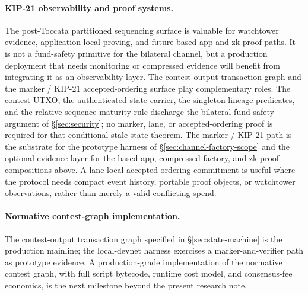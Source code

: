 \documentclass[10pt,a4paper]{article}
\begin{document}
\paragraph{KIP-21 observability and proof systems.} The post-Toccata partitioned sequencing surface is valuable for watchtower evidence, application-local proving, and future based-app and zk proof paths. It is not a fund-safety primitive for the bilateral channel, but a production deployment that needs monitoring or compressed evidence will benefit from integrating it as an observability layer. The contest-output transaction graph and the marker / KIP-21 accepted-ordering surface play complementary roles. The contest UTXO, the authenticated state carrier, the singleton-lineage predicates, and the relative-sequence maturity rule discharge the bilateral fund-safety argument of §\ref{sec:security}; no marker, lane, or accepted-ordering proof is required for that conditional stale-state theorem. The marker / KIP-21 path is the substrate for the prototype harness of §\ref{sec:channel-factory-scope} and the optional evidence layer for the based-app, compressed-factory, and zk-proof compositions above. A lane-local accepted-ordering commitment is useful where the protocol needs compact event history, portable proof objects, or watchtower observations, rather than merely a valid conflicting spend.

\paragraph{Normative contest-graph implementation.} The contest-output transaction graph specified in §\ref{sec:state-machine} is the production mainline; the local-devnet harness exercises a marker-and-verifier path as prototype evidence. A production-grade implementation of the normative contest graph, with full script bytecode, runtime cost model, and consensus-fee economics, is the next milestone beyond the present research note.
\end{document}
